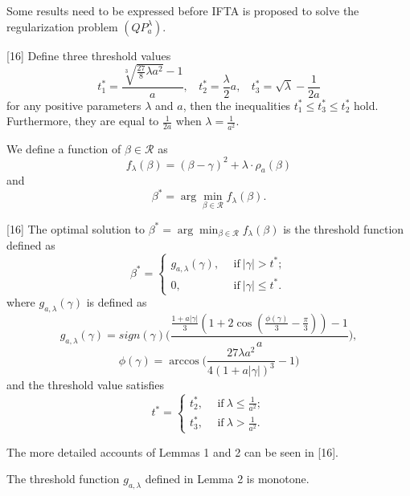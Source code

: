 \documentclass[smallextended]{svjour3}
\begin{document}
Some results need to be expressed before IFTA is proposed to solve the regularization problem $(QP_{a}^{\lambda})$.

\begin{lemma}\label{le1} {\rm [16]}
Define three threshold values
$$t_{1}^{\ast}=\frac{\sqrt[3]{\frac{27}{8}\lambda a^{2}}-1}{a}, \ \ \ \ t_{2}^{\ast}=\frac{\lambda}{2}a, \ \ \ \ t_{3}^{\ast}=\sqrt{\lambda}-\frac{1}{2a}$$
for any positive parameters $\lambda$ and $a$, then the inequalities $t_{1}^{\ast}\leq t_{3}^{\ast}\leq t_{2}^{\ast}$ hold. Furthermore,
they are equal to $\frac{1}{2a}$ when $\lambda=\frac{1}{a^{2}}$.
\end{lemma}

We define a function of $\beta\in \mathcal{R}$ as
$$f_{\lambda}(\beta)=(\beta-\gamma)^{2}+\lambda\cdot\rho_{a}(\beta)$$
and
$$\beta^{\ast}=\arg\min_{\beta\in \mathcal{R}}f_{\lambda}(\beta).$$
\begin{lemma}\label{le2} {\rm [16]}
The optimal solution to $\beta^{\ast}=\displaystyle \arg\min_{\beta\in \mathcal{R}} f_{\lambda}(\beta)$ is the threshold function defined as
\begin{equation}\label{r20}
\beta^{\ast}=\left\{
    \begin{array}{ll}
      g_{a,\lambda}(\gamma), & \ \ \mathrm{if} \ {|\gamma|> t^{\ast};} \\
      0, & \ \ \mathrm{if} \ {|\gamma|\leq t^{\ast}.}
    \end{array}
  \right.
\end{equation}
where $g_{a,\lambda}(\gamma)$ is defined as
\begin{equation}\label{r21}
g_{a,\lambda}(\gamma)=sign(\gamma)\bigg(\frac{\frac{1+a|\gamma|}{3}(1+2\cos(\frac{\phi(\gamma)}{3}-\frac{\pi}{3}))-1}{a}\bigg),
\end{equation}
$$\phi(\gamma)=\arccos\Big(\frac{27\lambda a^{2}}{4(1+a|\gamma|)^{3}}-1\Big)$$
and the threshold value satisfies
\begin{equation}\label{r22}
t^{\ast}=\left\{
    \begin{array}{ll}
      t_{2}^{\ast}, & \ \ \mathrm{if} \ {\lambda\leq \frac{1}{a^{2}};} \\
      t_{3}^{\ast}, & \ \ \mathrm{if} \ {\lambda>\frac{1}{a^{2}}.}
    \end{array}
  \right.
\end{equation}
\end{lemma}
The more detailed accounts of Lemmas 1 and 2 can be seen in [16].

\begin{proposition}\label{pro2}
The threshold function $g_{a,\lambda}$ defined in Lemma 2 is monotone.
\end{proposition}
\end{document}

